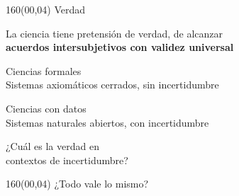 \documentclass[shownotes,aspectratio=169]{beamer}
\begin{document}
\begin{frame}[plain]
\begin{textblock}{160}(00,04)
\centering
\LARGE Verdad
\end{textblock}
\vspace{1.5cm} \large

\centering

 La ciencia tiene pretensión de verdad, de alcanzar\\

\textbf{acuerdos intersubjetivos con validez universal}

\vspace{0.7cm}

\pause

 \large Ciencias formales  \\
 \large  Sistemas axiomáticos cerrados, sin incertidumbre\\

 \vspace{0.3cm}

  \pause

 \large Ciencias con datos  \\
\large Sistemas naturales abiertos, con incertidumbre

\pause
\vspace{0.6cm}

\Large

¿Cuál es la verdad en \\ contextos de incertidumbre?
%
%
%

\end{frame}


\begin{frame}[plain]
\begin{textblock}{160}(00,04)
\centering
\LARGE ¿Todo vale lo mismo?\\
\end{textblock}
\vspace{1cm} \large



\end{frame}
\end{document}
